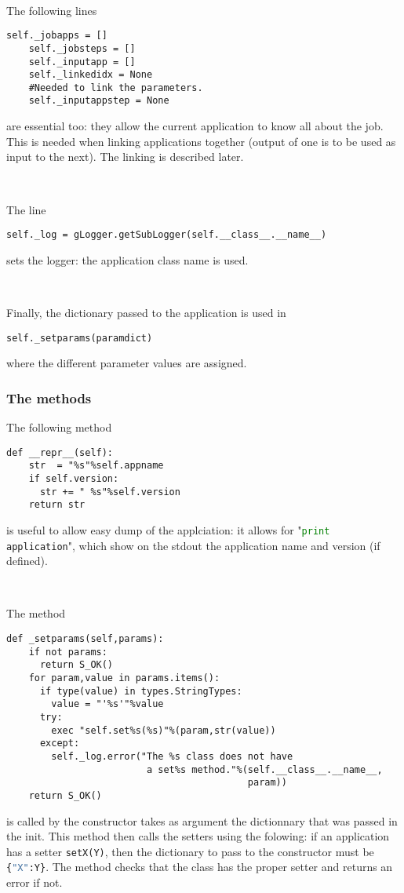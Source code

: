 \documentclass[a4paper,12pt]{article}
\begin{document}
~

The following lines
\begin{lstlisting}[firstnumber=81]
    self._jobapps = []
    self._jobsteps = []
    self._inputapp = []
    self._linkedidx = None
    #Needed to link the parameters.
    self._inputappstep = None
\end{lstlisting}
are essential too: they allow the current application to know all about the job.
This is needed when linking applications together (output of one is to be used
as input to the next). The linking is described later.

~

The line
\begin{lstlisting}[firstnumber=93]
    self._log = gLogger.getSubLogger(self.__class__.__name__)
\end{lstlisting}
sets the logger: the application class name is used.

~

Finally, the dictionary passed to the application is used in
\begin{lstlisting}[firstnumber=97]
    self._setparams(paramdict)
\end{lstlisting}
where the different parameter values are assigned. 

\subsubsection{The methods}
The following method
\begin{lstlisting}[firstnumber=99]
  def __repr__(self):
    str  = "%s"%self.appname
    if self.version:
      str += " %s"%self.version
    return str
\end{lstlisting}
is useful to allow easy dump of the applciation: it allows for 
"\lstinline[language=python]!print application!", 
which show on the stdout the application name and version (if defined).

~

The method
\begin{lstlisting}[firstnumber=105]
  def _setparams(self,params):
    if not params:
      return S_OK()
    for param,value in params.items():
      if type(value) in types.StringTypes:
        value = "'%s'"%value
      try:
        exec "self.set%s(%s)"%(param,str(value))
      except:
        self._log.error("The %s class does not have 
                         a set%s method."%(self.__class__.__name__,
                                           param))
    return S_OK()  
\end{lstlisting}
is called by the constructor takes as argument the dictionnary that was passed
in the init. This method then calls the setters using the folowing: if an
application has a setter \lstinline[language=python]!setX(Y)!, 
then the dictionary to pass to the constructor must be
\lstinline[language=python]!{"X":Y}!.
The method checks that the class has the proper setter and returns an error if
not.
\end{document}
